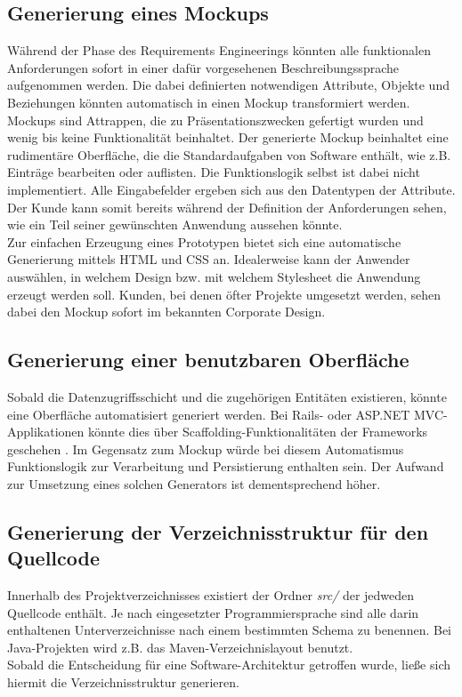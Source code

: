 \documentclass[a4paper,12pt]{scrreprt}
\begin{document}
\subsection{Generierung eines Mockups}
\label{sub:gen_prototyp}
Während der Phase des Requirements Engineerings könnten alle funktionalen Anforderungen sofort in einer dafür vorgesehenen Beschreibungssprache aufgenommen werden.
Die dabei definierten notwendigen Attribute, Objekte und Beziehungen könnten automatisch in einen Mockup transformiert werden. Mockups sind Attrappen, die zu Präsentationszwecken gefertigt wurden und wenig bis keine Funktionalität beinhaltet.
Der generierte Mockup beinhaltet eine rudimentäre Oberfläche, die die Standardaufgaben von Software enthält, wie z.B. Einträge bearbeiten oder auflisten. Die Funktionslogik selbst ist dabei nicht implementiert. Alle Eingabefelder ergeben sich aus den Datentypen der Attribute. Der Kunde kann somit bereits während der Definition der Anforderungen sehen, wie ein Teil seiner gewünschten Anwendung aussehen könnte.\\
Zur einfachen Erzeugung eines Prototypen bietet sich eine automatische Ge\-ne\-rie\-rung mittels HTML und CSS an.  
Idealerweise kann der Anwender auswählen, in welchem Design bzw. mit welchem Stylesheet die Anwendung erzeugt werden soll. Kunden, bei denen öfter Projekte umgesetzt werden, sehen dabei den Mockup sofort im bekannten Corporate Design. 
\subsection{Generierung einer benutzbaren Ober\-flä\-che}
\label{sub:gen_gui}
Sobald die Datenzugriffsschicht und die zugehörigen Entitäten existieren, könnte eine Oberfläche automatisiert generiert werden. Bei Rails- oder ASP.NET MVC-Applikationen könnte dies über Scaffolding-Funktionalitäten der Frameworks ge\-schehen \cite{railsScaffolding}. Im Gegensatz zum Mockup würde bei diesem Automatismus Funktionslogik zur Verarbeitung und Persistierung enthalten sein. Der Aufwand zur Umsetzung eines solchen Generators ist dementsprechend höher.

\subsection{Generierung der Verzeichnisstruktur für den Quellcode}
Innerhalb des Projektverzeichnisses existiert der Ordner \textit{src/} der jedweden Quellcode enthält. Je nach eingesetzter Programmiersprache sind alle darin enthaltenen Unterverzeichnisse nach einem bestimmten Schema zu benennen. Bei Java-Projekten wird z.B. das Maven-Verzeichnislayout benutzt.
\\
Sobald die Entscheidung für eine Software-Architektur getroffen wurde, ließe sich hiermit die Verzeichnisstruktur generieren.
\end{document}
